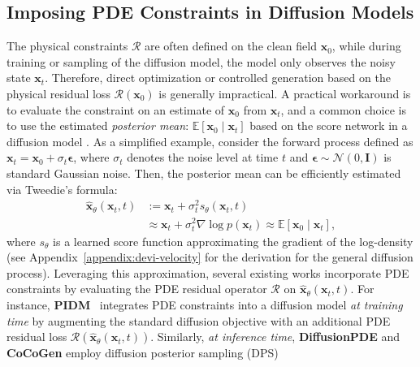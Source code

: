 \documentclass{article}
\theoremstyle{plain}
\theoremstyle{definition}
\theoremstyle{remark}
\def\vx{{\bm{x}}}
\begin{document}
\subsection{Imposing PDE Constraints in Diffusion Models}
The physical constraints $\mathcal{R}$ are often defined on the clean field $\vx_0$, while during training or sampling of the diffusion model, the model only observes the noisy state $\vx_t$. Therefore, direct optimization or controlled generation based on the physical residual loss $\mathcal{R}(\vx_0)$ is generally impractical. A practical workaround is to evaluate the constraint on an estimate of $\vx_0$ from $\vx_t$, and a common choice is to use the estimated \emph{posterior mean}: $\mathbb{E}[\vx_0\mid\vx_t]$ based on the score network in a diffusion model \citep{bastek2025pdim,huang2024diffusionpde}. As a simplified example, consider the forward process defined as $\vx_t = \vx_0 + \sigma_t \boldsymbol{\epsilon}$, where $\sigma_t$ denotes the noise level at time $t$ and $\boldsymbol{\epsilon} \sim \mathcal{N}(0, \mathbf{I})$ is standard Gaussian noise. Then, the posterior mean can be efficiently estimated via Tweedie's formula:
\begin{align*}
\hat{\vx}_\theta(\vx_t, t) & := \vx_t + \sigma_t^2 s_\theta(\vx_t, t) \\
& \approx \vx_t + \sigma_t^2\nabla \log p(\vx_t) \approx \mathbb{E}[\vx_0 \mid \vx_t],
\end{align*}
where $s_\theta$ is a learned score function approximating the gradient of the log-density (see Appendix~\ref{appendix:devi-velocity} for the derivation for the general diffusion process).
Leveraging this approximation, several existing works incorporate PDE constraints by evaluating the PDE residual operator $\mathcal{R}$ on $\hat{\vx}_\theta(\vx_t, t)$. For instance, \textbf{PIDM}~\cite{bastek2025pdim} integrates PDE constraints into a diffusion model \textit{at training time} by augmenting the standard diffusion objective with an additional PDE residual loss $\mathcal R(\hat{\vx}_\theta(\vx_t, t))$. Similarly, \textit{at inference time}, \textbf{DiffusionPDE} \cite{huang2024diffusionpde} and \textbf{CoCoGen} \cite{jacobsen2024cocogen} employ diffusion posterior sampling (DPS)
\end{document}
